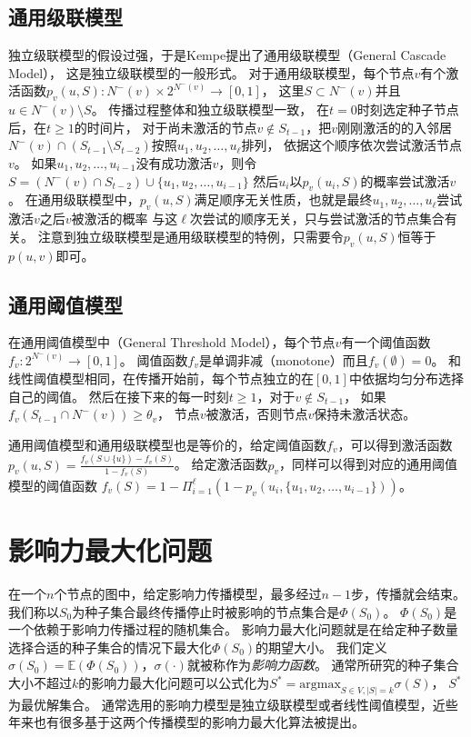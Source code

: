 \subsection{通用级联模型}
独立级联模型的假设过强，于是Kempe\cite{Kempe2003maximizing}提出了通用级联模型（General Cascade Model），
这是独立级联模型的一般形式。
对于通用级联模型，每个节点$v$有个激活函数$p_v(u,S):N^-(v) \times 2^{N^-(v)} \to [0,1]$，
这里$S \subset N^-(v)$并且$u \in N^-(v) \setminus S$。
传播过程整体和独立级联模型一致，
在$t=0$时刻选定种子节点后，在$t \geq 1$的时间片，
对于尚未激活的节点$v \not\in S_{t-1}$，把$v$刚刚激活的的入邻居$N^-(v) \cap (S_{t-1}\setminus S_{t-2})$按照$u_1,u_2,\dots,u_{\ell}$排列，
依据这个顺序依次尝试激活节点$v$。
如果$u_1,u_2,\dots,u_{i-1}$没有成功激活$v$，则令$S = (N^-(v) \cap S_{t-2}) \cup \{u_1,u_2,\dots,u_{i-1}\}$
然后$u_{i}$以$p_v(u_i,S)$的概率尝试激活$v$。
在通用级联模型中，$p_v(u,S)$满足顺序无关性质，也就是最终$u_1,u_2,\dots,u_{\ell}$尝试激活$v$之后$v$被激活的概率
与这$\ell$次尝试的顺序无关，只与尝试激活的节点集合有关。
注意到独立级联模型是通用级联模型的特例，只需要令$p_v(u,S)$恒等于$p(u,v)$即可。


\subsection{通用阈值模型}
在通用阈值模型中（General Threshold Model），每个节点$v$有一个阈值函数$f_v:2^{N^-(v)} \to [0,1]$。
阈值函数$f_v$是单调非减（monotone）而且$f_v(\emptyset)=0$。
和线性阈值模型相同，在传播开始前，每个节点独立的在$[0,1]$中依据均匀分布选择自己的阈值。
然后在接下来的每一时刻$t\geq 1$，对于$v \not\in S_{t-1}$，
如果$f_v(S_{t-1} \cap N^-(v)) \geq \theta_v$，
节点$v$被激活，否则节点$v$保持未激活状态。

通用阈值模型和通用级联模型也是等价的，给定阈值函数$f_v$，可以得到激活函数
$p_v(u,S) = \frac{f_v(S \cup \{u\}) - f_v(S)}{1-f_v(S)}$。
给定激活函数$p_v$，同样可以得到对应的通用阈值模型的阈值函数
$f_v(S) = 1 - \Pi_{i=1}^{\ell}(1-p_v(u_i, \{u_1,u_2,\dots,u_{i-1}\}))$。


\section{影响力最大化问题}
在一个$n$个节点的图中，给定影响力传播模型，最多经过$n-1$步，传播就会结束。
我们称以$S_0$为种子集合最终传播停止时被影响的节点集合是$\Phi(S_0)$。
$\Phi(S_0)$是一个依赖于影响力传播过程的随机集合。
影响力最大化问题就是在给定种子数量选择合适的种子集合的情况下最大化$\Phi(S_0)$的期望大小。
我们定义$\sigma(S_0) = \mathbb{E}(\Phi(S_0))$，$\sigma(\cdot)$就被称作为{\it 影响力函数}。
通常所研究的种子集合大小不超过$k$的影响力最大化问题可以公式化为$S^* = \mathrm{argmax}_{S \in V, |S|=k} \sigma(S)$，
$S^*$为最优解集合。
通常选用的影响力模型是独立级联模型或者线性阈值模型，近些年来也有很多基于这两个传播模型的影响力最大化算法被提出。

